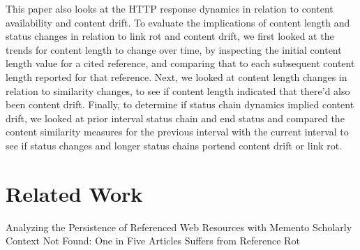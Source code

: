 \documentclass[12pt]{article}
\begin{document}
This paper also looks at the HTTP response dynamics in relation to content availability and content drift. To evaluate the implications of content length and status changes in relation to link rot and content drift, we first looked at the trends for content length to change over time, by inspecting the initial content length value for a cited reference, and comparing that to each subsequent content length reported for that reference. Next, we looked at content length changes in relation to similarity changes, to see if content length indicated that there'd also been content drift. Finally, to determine if status chain dynamics implied content drift, we looked at prior interval status chain and end status and compared the content similarity measures for the previous interval with the current interval to see if status changes and longer status chains portend content drift or link rot.
\section{Related Work}
Analyzing the Persistence of Referenced Web Resources with Memento 
Scholarly Context Not Found: One in Five Articles Suffers from Reference Rot
\end{document}
